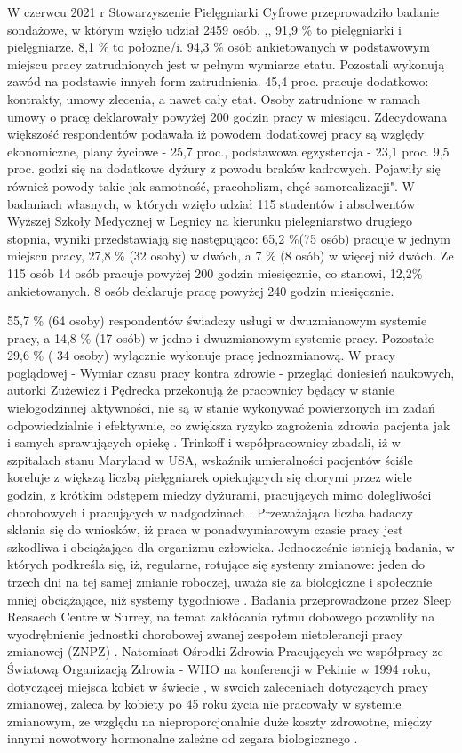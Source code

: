 \documentclass[a4paper,12pt,twoside,openany]{report}
\begin{document}
W czerwcu 2021 r Stowarzyszenie Pielęgniarki Cyfrowe przeprowadziło badanie sondażowe, w którym wzięło udział 2459 osób. ,, 91,9 \% to pielęgniarki i pielęgniarze. 8,1 \% to położne/i. 94,3 \% osób ankietowanych w podstawowym miejscu pracy zatrudnionych jest w pełnym wymiarze etatu. Pozostali wykonują zawód na podstawie innych form zatrudnienia. 45,4 proc. pracuje dodatkowo: kontrakty, umowy zlecenia, a nawet cały etat. Osoby zatrudnione w ramach umowy o pracę deklarowały powyżej 200 godzin pracy w miesiącu. Zdecydowana większość respondentów podawała iż powodem dodatkowej pracy są względy ekonomiczne, plany życiowe - 25,7 proc., podstawowa egzystencja -  23,1 proc. 9,5 proc. godzi się na dodatkowe dyżury z powodu braków kadrowych. Pojawiły się również powody takie jak samotność, pracoholizm, chęć samorealizacji"\cite{cyfrowe}. W badaniach własnych, w których wzięło udział 115 studentów i absolwentów Wyższej Szkoły Medycznej  w Legnicy na kierunku pielęgniarstwo drugiego stopnia, wyniki  przedstawiają się następująco: 65,2 \%(75 osób) pracuje w jednym miejscu pracy, 27,8 \% (32 osoby) w dwóch, a 7 \% (8 osób) w więcej niż dwóch.  Ze 115 osób 14 osób pracuje powyżej 200 godzin miesięcznie, co stanowi, 12,2\% ankietowanych. 8 osób deklaruje pracę powyżej  240 godzin miesięcznie. 

55,7 \%  (64 osoby) respondentów świadczy usługi w dwuzmianowym systemie pracy, a 14,8 \% (17 osób) w jedno i dwuzmianowym systemie pracy. Pozostałe 29,6 \% ( 34 osoby) wyłącznie wykonuje pracę jednozmianową. W pracy poglądowej - Wymiar czasu pracy kontra zdrowie - przegląd doniesień naukowych, autorki Zużewicz i  Pędrecka przekonują że pracownicy będący w stanie wielogodzinnej aktywności, nie są w stanie wykonywać powierzonych im zadań odpowiedzialnie i efektywnie, co zwiększa ryzyko zagrożenia zdrowia pacjenta jak i samych sprawujących opiekę \cite{kontra}. Trinkoff i współpracownicy zbadali, iż w szpitalach stanu Maryland w USA, wskaźnik umieralności pacjentów ściśle koreluje z większą liczbą pielęgniarek opiekujących się chorymi przez wiele godzin, z krótkim odstępem miedzy dyżurami, pracujących mimo dolegliwości chorobowych i pracujących w nadgodzinach \cite{trinkoff}. Przeważająca liczba badaczy skłania się do wniosków, iż praca w ponadwymiarowym czasie pracy jest szkodliwa i obciążająca dla organizmu człowieka. Jednocześnie istnieją badania, w których podkreśla się, iż,  regularne, rotujące się systemy zmianowe: jeden do trzech dni na tej samej zmianie roboczej, uważa się za biologiczne i społecznie mniej obciążające, niż systemy tygodniowe \cite{konflikt}. Badania przeprowadzone przez Sleep Reasaech Centre w Surrey, na temat zakłócania rytmu dobowego pozwoliły na wyodrębnienie jednostki chorobowej zwanej zespołem nietolerancji pracy zmianowej (ZNPZ) \cite{znpz}.  Natomiast  Ośrodki Zdrowia Pracujących  we  współpracy ze Światową Organizacją Zdrowia - WHO  na konferencji w Pekinie w 1994 roku, dotyczącej miejsca kobiet w świecie , w swoich zaleceniach dotyczących pracy zmianowej, zaleca by kobiety po 45 roku życia nie pracowały w systemie zmianowym, ze względu na nieproporcjonalnie duże koszty zdrowotne, między innymi nowotwory hormonalne zależne od zegara biologicznego \cite{zalecenia}.
\end{document}
